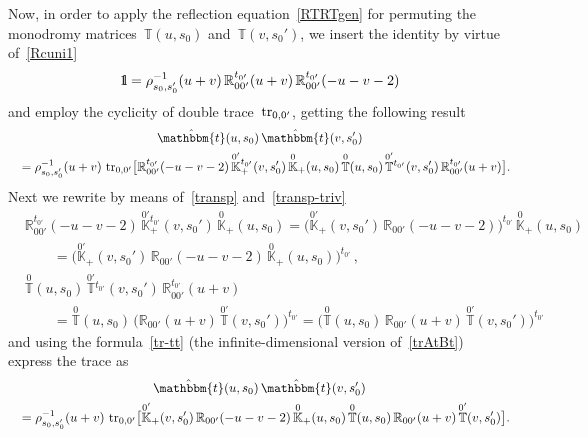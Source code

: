 \documentclass[a4paper,11pt]{article}
\newcommand{\tr}{\mathop{\rm tr}\nolimits}
\def\II{\hbox{{1}\kern-.25em\hbox{l}}}
\numberwithin{equation}{section}
\begin{document}
Now, in order to apply the reflection equation~\eqref{RTRTgen} for permuting the monodromy matrices~$\mathbb{T}(u,s_0)$ and~$\mathbb{T}(v,s_0')$, we insert the identity by virtue of~\eqref{Rcuni1}
\begin{equation}
	\II = \rho_{s_0,s_0'}^{-1}(u+v)\,\mathbb{R}_{00'}^{t_{0'}}(u+v)\,\mathbb{R}_{00'}^{t_{0'}}(-u-v-2)
\end{equation}
and employ the cyclicity of double trace~$\tr_{0,0'}$, getting the following result
\begin{multline*}
	\hat{\mathbbm{t}}(u,s_0)\,\hat{\mathbbm{t}}(v,s_0') \\
	\quad =
	\rho_{s_0,s_0'}^{-1}(u+v) \,
	\tr_{0,0'}\bigl[\mathbb{R}_{00'}^{t_{0'}}(-u-v-2)\,\overset{0'}{\mathbb{K}}{}_+^{t_{0'}}(v,s_0')\,\overset{0}{\mathbb{K}}_+(u,s_0)\,\overset{0}{\mathbb{T}}(u,s_0)\,\overset{0'}{\mathbb{T}}{}^{t_{0'}}(v,s_0')\,\mathbb{R}_{00'}^{t_{0'}}(u+v)\bigr] .
\end{multline*}
Next we rewrite by means of~\eqref{transp} and~\eqref{transp-triv}
\begin{align}
	& \nonumber 
	\mathbb{R}_{00'}^{t_{0'}}(-u-v-2)\,\overset{0'}{\mathbb{K}}{}_+^{t_{0'}}(v,s_0')\,\overset{0}{\mathbb{K}}_+(u,s_0)
	= \bigl(\overset{0'}{\mathbb{K}}{}_+(v,s_0')\,\mathbb{R}_{00'}(-u-v-2)\bigr)^{t_{0'}} \, \overset{0}{\mathbb{K}}_+(u,s_0) \\
	& \nonumber 
	\qquad =
	\bigl(\overset{0'}{\mathbb{K}}{}_+(v,s_0')\,\mathbb{R}_{00'}(-u-v-2)\,\overset{0}{\mathbb{K}}_+(u,s_0)\bigr)^{t_{0'}} \,, \\
	& \nonumber
	\overset{0}{\mathbb{T}}(u,s_0)\,\overset{0'}{\mathbb{T}}{}^{t_{0'}}(v,s_0')\,\mathbb{R}_{00'}^{t_{0'}}(u+v) \\
	& \nonumber
	\qquad
	= \overset{0}{\mathbb{T}}(u,s_0) \, \bigl(\mathbb{R}_{00'}(u+v)\,\overset{0'}{\mathbb{T}}(v,s_0')\bigr)^{t_{0'}}
	= \bigl(\overset{0}{\mathbb{T}}(u,s_0)\,\mathbb{R}_{00'}(u+v)\,\overset{0'}{\mathbb{T}}(v,s_0')\bigr)^{t_{0'}}
\end{align}
and using  the formula~\eqref{tr-tt} (the infinite-dimensional version of~\eqref{trAtBt}) express the trace as
\begin{multline} \nonumber
	\hat{\mathbbm{t}}(u,s_0)\,\hat{\mathbbm{t}}(v,s_0') \\
	\quad =
	\rho_{s_0,s_0'}^{-1}(u+v) \,
	\tr_{0,0'}\bigl[
	\overset{0'}{\mathbb{K}}{}_+(v,s_0')\,\mathbb{R}_{00'}(-u-v-2)\,\overset{0}{\mathbb{K}}_+(u,s_0) \,
	\overset{0}{\mathbb{T}}(u,s_0)\,\mathbb{R}_{00'}(u+v)\,\overset{0'}{\mathbb{T}}(v,s_0')
	\bigr] .
\end{multline}
\end{document}

